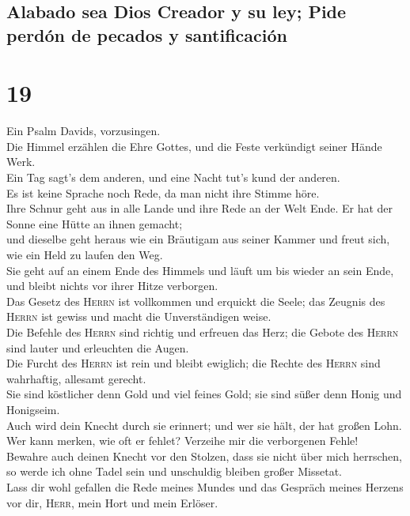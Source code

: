 \hypertarget{alabado-sea-dios-creador-y-su-ley-pide-perduxf3n-de-pecados-y-santificaciuxf3n}{%
\subsection{Alabado sea Dios Creador y su ley; Pide perdón de pecados y
santificación}\label{alabado-sea-dios-creador-y-su-ley-pide-perduxf3n-de-pecados-y-santificaciuxf3n}}

\hypertarget{section-18}{%
\section{19}\label{section-18}}

 Ein Psalm Davids, vorzusingen.\\
 Die Himmel erzählen die Ehre Gottes, und die Feste
verkündigt seiner Hände Werk.\\
 Ein Tag sagt's dem anderen, und eine Nacht tut's kund der
anderen.\\
 Es ist keine Sprache noch Rede, da man nicht ihre Stimme
höre.\\
 Ihre Schnur geht aus in alle Lande und ihre Rede an der
Welt Ende. Er hat der Sonne eine Hütte an ihnen gemacht;\\
 und dieselbe geht heraus wie ein Bräutigam aus seiner
Kammer und freut sich, wie ein Held zu laufen den Weg.\\
 Sie geht auf an einem Ende des Himmels und läuft um bis
wieder an sein Ende, und bleibt nichts vor ihrer Hitze verborgen.\\
 Das Gesetz des \textsc{Herrn} ist vollkommen und erquickt
die Seele; das Zeugnis des \textsc{Herrn} ist gewiss und macht die
Unverständigen weise.\\
 Die Befehle des \textsc{Herrn} sind richtig und erfreuen
das Herz; die Gebote des \textsc{Herrn} sind lauter und erleuchten die
Augen.\\
 Die Furcht des \textsc{Herrn} ist rein und bleibt
ewiglich; die Rechte des \textsc{Herrn} sind wahrhaftig, allesamt
gerecht.\\
 Sie sind köstlicher denn Gold und viel feines Gold; sie
sind süßer denn Honig und Honigseim.\\
 Auch wird dein Knecht durch sie erinnert; und wer sie
hält, der hat großen Lohn.\\
 Wer kann merken, wie oft er fehlet? Verzeihe mir die
verborgenen Fehle!\\
 Bewahre auch deinen Knecht vor den Stolzen, dass sie
nicht über mich herrschen, so werde ich ohne Tadel sein und unschuldig
bleiben großer Missetat.\\
 Lass dir wohl gefallen die Rede meines Mundes und das
Gespräch meines Herzens vor dir, \textsc{Herr}, mein Hort und mein
Erlöser.

